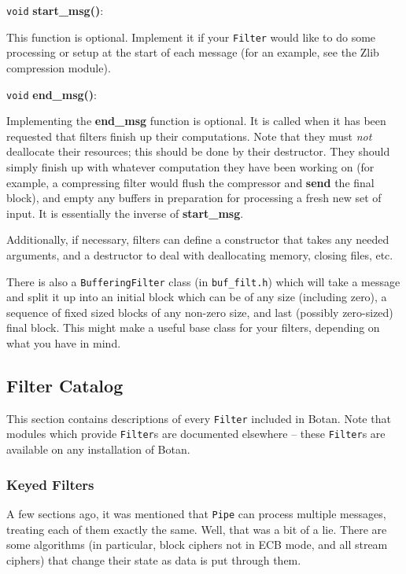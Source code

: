 \documentclass{article}
\newcommand{\filename}[1]{\texttt{#1}}
\newcommand{\function}[1]{\textbf{#1}}
\newcommand{\type}[1]{\texttt{#1}}
\begin{document}
\noindent
\type{void} \function{start\_msg()}:

This function is optional. Implement it if your \type{Filter} would like to do
some processing or setup at the start of each message (for an example, see the
Zlib compression module).

\noindent
\type{void} \function{end\_msg()}:

Implementing the \function{end\_msg} function is optional. It is called when it
has been requested that filters finish up their computations. Note that they
must \emph{not} deallocate their resources; this should be done by their
destructor. They should simply finish up with whatever computation they have
been working on (for example, a compressing filter would flush the compressor
and \function{send} the final block), and empty any buffers in preparation for
processing a fresh new set of input. It is essentially the inverse of
\function{start\_msg}.

Additionally, if necessary, filters can define a constructor that takes any
needed arguments, and a destructor to deal with deallocating memory, closing
files, etc.

There is also a \type{BufferingFilter} class (in \filename{buf\_filt.h}) which
will take a message and split it up into an initial block which can be of any
size (including zero), a sequence of fixed sized blocks of any non-zero size,
and last (possibly zero-sized) final block. This might make a useful base class
for your filters, depending on what you have in mind.

\pagebreak

\subsection{Filter Catalog}

This section contains descriptions of every \type{Filter} included in Botan.
Note that modules which provide \type{Filter}s are documented elsewhere --
these \type{Filter}s are available on any installation of Botan.

\subsubsection{Keyed Filters}

A few sections ago, it was mentioned that \type{Pipe} can process multiple
messages, treating each of them exactly the same. Well, that was a bit of a
lie. There are some algorithms (in particular, block ciphers not in ECB mode,
and all stream ciphers) that change their state as data is put through them.
\end{document}
